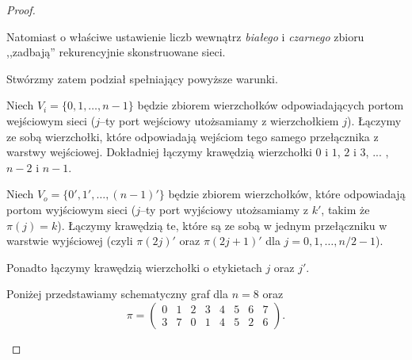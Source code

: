 \documentclass[a4paper]{article}
\theoremstyle{definition}
\begin{document}
\begin{proof}
\begin{enumerate}
        Natomiast o właściwe ustawienie liczb wewnątrz \emph{białego} i \emph{czarnego} zbioru ,,zadbają'' rekurencyjnie skonstruowane sieci.

        \vspace{.1em}

        Stwórzmy zatem podział spełniający powyższe warunki. 

        \vspace{.1em}
        
        Niech \(V_i = \{ 0, 1, \ldots, n-1 \}\) będzie zbiorem wierzchołków odpowiadających portom wejściowym sieci (\(j\)--ty port wejściowy  utożsamiamy z wierzchołkiem \(j\)). Łączymy ze sobą wierzchołki, które odpowiadają wejściom tego samego przełącznika z warstwy wejściowej. Dokładniej łączymy krawędzią  wierzchołki $0$ i $1$, $2$ i $3$, ... , $n-2$ i $n-1$. 

        \vspace{.1em}
        Niech $V_o = \{0', 1', \ldots, (n-1)'\}$ będzie zbiorem wierzchołków, które odpowiadają portom wyjściowym sieci (\(j\)--ty port wyjściowy utożsamiamy z \(k'\), takim że \(\pi(j) = k\)). Łączymy krawędzią te, które są ze sobą w jednym przełączniku w warstwie wyjściowej (czyli \(\pi(2j)'\) oraz \(\pi(2j+1)'\) dla \(j = 0, 1, \ldots, n/2 - 1\)). 

        
        Ponadto łączymy krawędzią wierzchołki o etykietach $j$ oraz $j'$.

        Poniżej przedstawiamy schematyczny graf dla \(n = 8\) oraz 
        \[
            \pi = \begin{pmatrix}
                0 & 1 & 2 & 3 & 4 & 5 & 6 & 7 \\
                3 & 7 & 0 & 1 & 4 & 5 & 2 & 6
              \end{pmatrix}.
        \]


\end{enumerate}
\end{proof}
\end{document}
